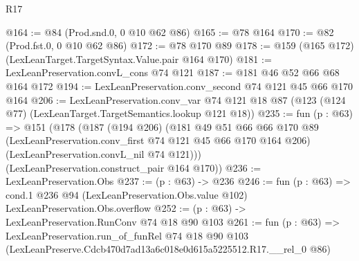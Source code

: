 \begin{lexlean}{R17}
\begin{coremodule}
@164 := @84 (Prod.snd.{0, 0} @10 @62 @86)
@165 := @78 @164
@170 := @82 (Prod.fst.{0, 0} @10 @62 @86)
@172 := @78 @170 @89
@178 := @159 (@165 @172) (LexLeanTarget.TargetSyntax.Value.pair @164 @170)
@181 := LexLeanPreservation.convL_cons @74 @121
@187 := @181 @46 @52 @66 @68 @164 @172
@194 := LexLeanPreservation.conv_second @74 @121 @45 @66 @170 @164
@206 := LexLeanPreservation.conv_var
    @74
    @121
    @18
    @87
    (@123 (@124 @77) (LexLeanTarget.TargetSemantics.lookup @121 @18))
@235 := fun (p : @63) =>
  @151
    (@178
      (@187
        (@194 @206)
        (@181
          @49
          @51
          @66
          @66
          @170
          @89
          (LexLeanPreservation.conv_first @74 @121 @45 @66 @170 @164 @206)
          (LexLeanPreservation.convL_nil @74 @121)))
      (LexLeanPreservation.construct_pair @164 @170))
@236 := LexLeanPreservation.Obs
@237 := (p : @63) -> @236
@246 := fun (p : @63) =>
  cond.{1} @236 @94 (LexLeanPreservation.Obs.value @102) LexLeanPreservation.Obs.overflow
@252 := (p : @63) -> LexLeanPreservation.RunConv @74 @18 @90 @103
@261 := fun (p : @63) =>
  LexLeanPreservation.run_of_funRel
    @74
    @18
    @90
    @103
    (LexLeanPreserve.Cdcb470d7ad13a6c018e0d615a5225512.R17.__rel_0 @86)
\end{coremodule}
\end{lexlean}

